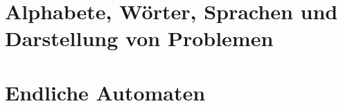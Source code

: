 \documentclass{article}
\begin{document}
\section{Alphabete, Wörter, Sprachen und Darstellung von Problemen}





\newsection
\section{Endliche Automaten}



\end{document}
